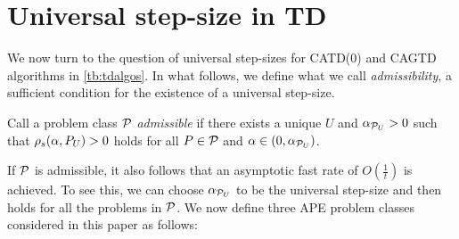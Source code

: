 \section{Universal step-size in TD}\label{sec:rl}
We now turn to the question of universal step-sizes for CATD(0) and CAGTD algorithms in \eqref{tb:tdalgos}. In what follows, we define what we call \emph{admissibility},  a sufficient condition for the existence of a universal step-size. 
\begin{definition}\label{def:admis}
Call a problem class $\P$ \emph{admissible} if there exists a unique $U$ and $\alpha_{\P_U}>0$ such that
$\rhos{P_U}>0$ holds for all $P\in \P$ and $\alpha\in(0,\alpha_{\P_U})$.
\end{definition}
If $\P$ is admissible, it also follows that an asymptotic fast rate of $O(\frac1t)$ is achieved. To see this, we can choose $\alpha_{\P_U}$ to be the universal step-size and then  holds for all the problems in $\P$. We now define three APE problem classes considered in this paper as follows:
\begin{comment}
\begin{table}
\resizebox{\columnwidth}{!}{
\begin{tabular}{|c|c|c|c|}\hline
Class &Fixed &Variable &Remark\\\hline
$\P_{TDON}$ & $\Phi,S,A,\gamma$ & $\pi,P,R$ &$\mu=d_{\pi}, \EE{\phi_t\phi_t}=\EE{\phi'_t\phi'_t}$\\\hline
$\P_{TDOFF}$ & $\Phi,S,A,\gamma$ & $\pi,\mu,P,R$ &$\mu\neq d_{\pi}, \EE{\phi_t\phi_t}=\EE{\phi'_t\phi'_t}$, $\norm{\phi_t}=1$\\\hline
$\P_{GTDOFF}$ & $\Phi,S,A,\gamma$ & $\pi,\mu,P,R$ &$\mu\neq d_{\pi}$\\\hline
\end{tabular}
}
\end{table}
\end{comment}
\FloatBarrier
\begin{table}[h]
\caption{Here, $S,A,\gamma$ are fixed across all the class and the second column shows the quantities that vary across the respective classes. These three capture \emph{on/off-policy} learning scenarios arising in RL.}
\end{table}
